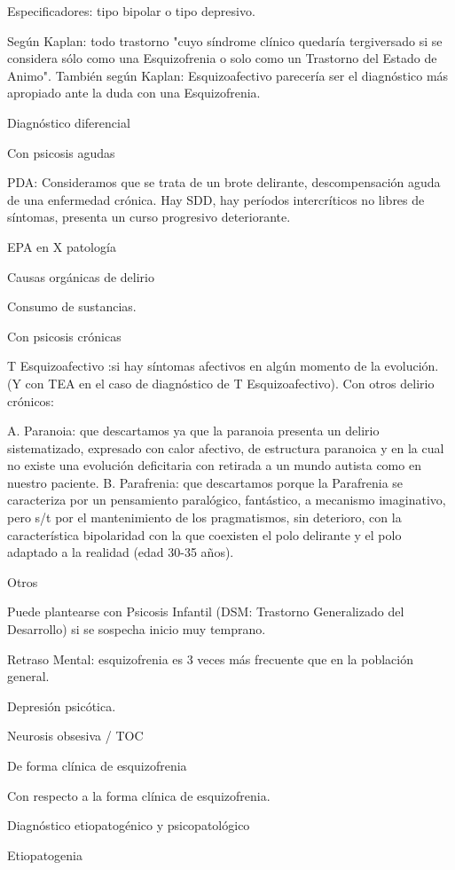 \documentclass[encares.tex]{subfiles}
\begin{document}
Especificadores: tipo bipolar o tipo depresivo.

Según Kaplan: todo trastorno "cuyo síndrome clínico quedaría tergiversado si se considera sólo como una Esquizofrenia o solo como un Trastorno del Estado de Animo". También según Kaplan: Esquizoafectivo parecería ser el diagnóstico más apropiado ante la duda con una Esquizofrenia.

Diagnóstico diferencial

Con psicosis agudas

PDA: Consideramos que se trata de un brote delirante, descompensación aguda de una enfermedad crónica. Hay SDD, hay períodos intercríticos no libres de síntomas, presenta un curso progresivo deteriorante.

EPA en X patología

Causas orgánicas de delirio

Consumo de sustancias.

Con psicosis crónicas

T Esquizoafectivo :si hay síntomas afectivos en algún momento de la evolución. (Y con TEA en el caso de diagnóstico de T Esquizoafectivo). Con otros delirio crónicos:

A. Paranoia: que descartamos ya que la paranoia presenta un delirio sistematizado, expresado con calor afectivo, de estructura paranoica y en la cual no existe una evolución deficitaria con retirada a un mundo autista como en nuestro paciente.
B. Parafrenia: que descartamos porque la Parafrenia se caracteriza por un pensamiento paralógico, fantástico, a mecanismo imaginativo, pero s/t por el mantenimiento de los pragmatismos, sin deterioro, con la característica bipolaridad con la que coexisten el polo delirante y el polo adaptado a la realidad (edad 30-35 años).

Otros

Puede plantearse con Psicosis Infantil (DSM: Trastorno Generalizado del Desarrollo) si se sospecha inicio muy temprano.

Retraso Mental: esquizofrenia es 3 veces más frecuente que en la población general.

Depresión psicótica.

Neurosis obsesiva / TOC

De forma clínica de esquizofrenia

Con respecto a la forma clínica de esquizofrenia.

Diagnóstico etiopatogénico y psicopatológico

Etiopatogenia
\end{document}
